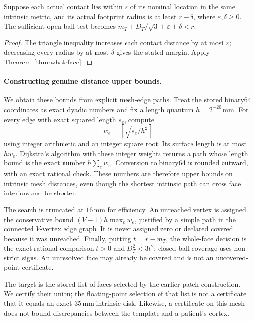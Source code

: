 \begin{corollary}\label{cor:errorbudget}
Suppose each actual contact lies within $\varepsilon$ of its nominal
location in the same intrinsic metric, and its actual footprint radius is
at least $r-\delta$, where $\varepsilon,\delta\ge0$. The sufficient open-ball
test becomes $m_T+D_T/\sqrt3+\varepsilon+\delta<r$.
\end{corollary}
\begin{proof}
The triangle inequality increases each contact distance by at most
$\varepsilon$; decreasing every radius by at most $\delta$ gives the stated
margin. Apply Theorem~\ref{thm:wholeface}.
\end{proof}

\paragraph{Constructing genuine distance upper bounds.}
We obtain these bounds from explicit mesh-edge paths. Treat the stored
binary64 coordinates as exact dyadic numbers and fix a length quantum
$h=2^{-20}$\,mm. For every edge with exact squared length $s_e$, compute
\[
             w_e=\left\lceil\sqrt{s_e/h^2}\right\rceil
\]
using integer arithmetic and an integer square root. Its surface length is
at most $hw_e$. Dijkstra's algorithm with these integer weights returns a
path whose length bound is the exact number $h\sum_e w_e$. Conversion to
binary64 is rounded outward, with an exact rational check. These numbers
are therefore upper bounds on intrinsic mesh distances, even though the
shortest intrinsic path can cross face interiors and be shorter.

The search is truncated at $16$\,mm for efficiency. An unreached vertex is
assigned the conservative bound $(V-1)h\max_e w_e$, justified by a simple
path in the connected $V$-vertex edge graph. It is never assigned zero or
declared covered because it was unreached. Finally, putting $t=r-m_T$, the
whole-face decision is the exact rational comparison $t>0$ and
$D_T^2<3t^2$; closed-ball coverage uses non-strict signs. An unresolved face
may already be covered and is not an uncovered-point certificate.

The target is the stored list of \patchTris{} faces selected by the earlier
patch construction. We certify their union; the floating-point selection
of that list is not a certificate that it equals an exact $35$\,mm intrinsic
disk. Likewise, a certificate on this mesh does not bound discrepancies
between the template and a patient's cortex.

